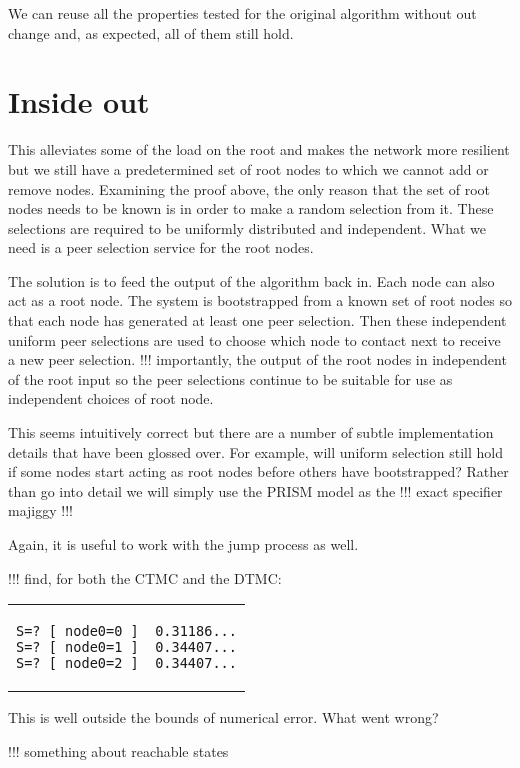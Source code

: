 \documentclass[a4paper,10pt]{article}
\newcommand{\prismmodel}[1]{
  \begin{quotation}
  \footnotesize
  
  \end{quotation}
}
\newenvironment{prismprop}[0]{
  \begin{center}
  \begin{tabular}{c}
  \footnotesize
}{
  \end{tabular}
  \end{center}
}
\begin{document}
We can reuse all the properties tested for the original algorithm without out change and, as expected, all of them still hold.

\section{Inside out}

This alleviates some of the load on the root and makes the network more resilient but we still have a predetermined set of root nodes to which we cannot add or remove nodes. Examining the proof above, the only reason that the set of root nodes needs to be known is in order to make a random selection from it. These selections are required to be uniformly distributed and independent. What we need is a peer selection service for the root nodes.

The solution is to feed the output of the algorithm back in. Each node can also act as a root node. The system is bootstrapped from a known set of root nodes so that each node has generated at least one peer selection. Then these independent uniform peer selections are used to choose which node to contact next to receive a new peer selection. !!! importantly, the output of the root nodes in independent of the root input so the peer selections continue to be suitable for use as independent choices of root node.

This seems intuitively correct but there are a number of subtle implementation details that have been glossed over. For example, will uniform selection still hold if some nodes start acting as root nodes before others have bootstrapped? Rather than go into detail we will simply use the PRISM model as the !!! exact specifier majiggy !!!

\prismmodel{ctmc_broken}

Again, it is useful to work with the jump process as well.

\prismmodel{dtmc_broken}

!!! find, for both the CTMC and the DTMC:

\begin{prismprop}
\begin{lstlisting}
S=? [ node0=0 ]  0.31186...
S=? [ node0=1 ]  0.34407...
S=? [ node0=2 ]  0.34407...
\end{lstlisting}
\end{prismprop}

This is well outside the bounds of numerical error. What went wrong? 

!!! something about reachable states
\end{document}

